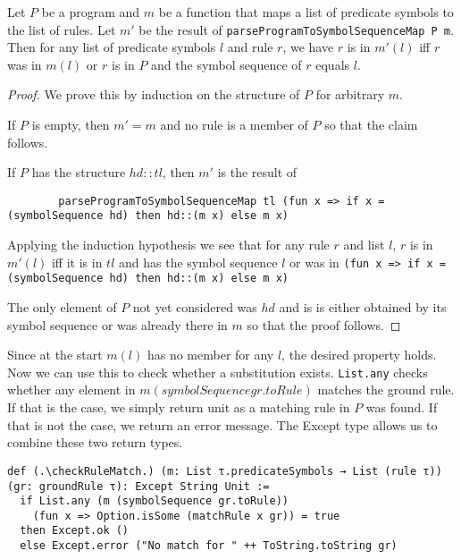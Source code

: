 \begin{lemma}[\parseProgramToSymbolSequenceMapmem]\label{lem:parseProgramToSymbolSequenceMap}
    Let $P$ be a program and $m$ be a function that maps a list of predicate symbols to the list of rules. Let $m'$ be the result of \lstinline|parseProgramToSymbolSequenceMap P m|. Then for any list of predicate symbols $l$ and rule $r$, we have $r$ is in $m'(l)$ iff $r$ was in $m(l)$ or $r$ is in $P$ and the symbol sequence of $r$ equals $l$.
\end{lemma}
\begin{proof}
    We prove this by induction on the structure of $P$ for arbitrary $m$.

    If $P$ is empty, then $m' = m$ and no rule is a member of $P$ so that the claim follows.

    If $P$ has the structure $hd::tl$, then $m'$ is the result of 

    \begin{lstlisting}
        parseProgramToSymbolSequenceMap tl (fun x => if x = (symbolSequence hd) then hd::(m x) else m x)
    \end{lstlisting}

    Applying the induction hypothesis we see that for any rule $r$ and list $l$, $r$ is in $m'(l)$ iff it is in $tl$ and has the symbol sequence $l$ or was in \lstinline|(fun x => if x = (symbolSequence hd) then hd::(m x) else m x)|

    The only element of $P$ not yet considered was $hd$ and is is either obtained by its symbol sequence or was already there in $m$ so that the proof follows.
\end{proof}

Since at the start $m(l)$ has no member for any $l$, the desired property holds. Now we can use this to check whether a substitution exists. \lstinline|List.any| checks whether any element in $m(symbolSequence gr.toRule)$ matches the ground rule. If that is the case, we simply return unit as a matching rule in $P$ was found. If that is not the case, we return an error message. The Except type allows us to combine these two return types.

\begin{lstlisting}
def (.\checkRuleMatch.) (m: List τ.predicateSymbols → List (rule τ)) (gr: groundRule τ): Except String Unit :=
  if List.any (m (symbolSequence gr.toRule)) 
    (fun x => Option.isSome (matchRule x gr)) = true
  then Except.ok ()
  else Except.error ("No match for " ++ ToString.toString gr)
\end{lstlisting}

